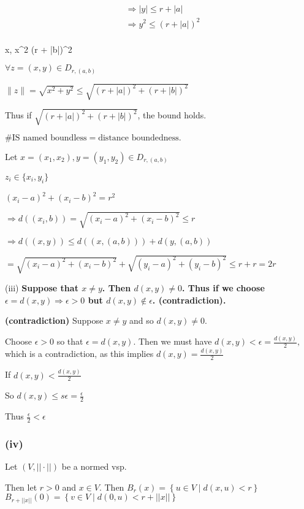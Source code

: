 \documentclass{article}
\theoremstyle{definition}
\numberwithin{equation}{section}
\begin{document}
\begin{align*}
&\Rightarrow |y| \leq r + |a| \\
&\Rightarrow y^2 \leq (r + |a|)^2 \\
\end{align*}

 x, x^2 \leq (r + |b|)^2

$\forall z = (x,y) \in D_{r, (a,b)}$

$\|z\| = \sqrt{x^2 + y^2} \leq \sqrt{(r+|a|)^2 + (r+|b|)^2}$

Thus if \(\sqrt{(r+|a|)^2 + (r+|b|)^2}\), the bound holds.

$
\#\text{IS named boundless} = \text{distance boundedness.}
$

Let \( x = (x_1, x_2), y = (y_1, y_2) \in D_{r,(a,b)} \)

$
z_i \in \{x_i, y_i\}
$

$
(x_i - a)^2 + (x_i - b)^2 = r^2
$

$
\Rightarrow d((x_i, b)) = \sqrt{(x_i - a)^2 + (x_i - b)^2} \leq r
$

$
\Rightarrow d((x, y)) \leq d((x, (a,b))) + d(y, (a,b))
$

$
= \sqrt{(x_i - a)^2 + (x_i - b)^2} + \sqrt{(y_i - a)^2 + (y_i - b)^2} \leq r + r = 2r
$

\noindent (iii) \textbf{Suppose that $x \neq y$. Then $d(x,y) \neq 0$. Thus if we choose $\epsilon = d(x,y) \Rightarrow \epsilon > 0$ but $d(x,y) \notin \epsilon$. (contradiction).}

\textbf{(contradiction)} Suppose $x \neq y$ and so $d(x,y) \neq 0$. 

Choose $\epsilon > 0$ so that $\epsilon = d(x,y)$. Then we must have 
$ d(x,y) < \epsilon = \frac{d(x,y)}{2}, $
which is a contradiction, as this implies 
$ d(x,y) = \frac{d(x,y)}{2} $

If $d(x,y) < \frac{d(x,y)}{2}$ 

So $d(x,y) \leq s \epsilon = \frac{\epsilon}{2} $

Thus $ \frac{\epsilon}{2} < \epsilon $

\subsubsection*{(iv)}

Let $(V, || \cdot ||)$ be a normed vsp.

Then let $r > 0$ and $x \in V$. Then 
$ B_r(x) = \left\{ u \in V \mid d(x,u) < r \right\} $
$ B_{r + || x ||}(0) = \left\{ v \in V \mid d(0,u) < r + || x || \right\} $
\end{document}
